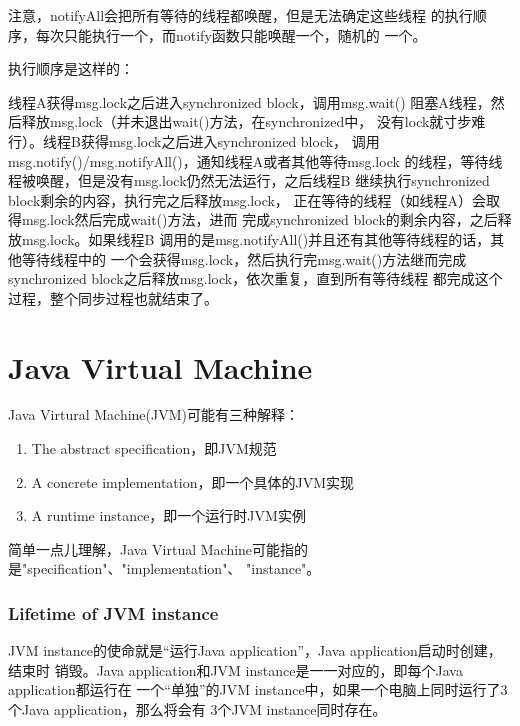 \documentclass[a4paper,11pt]{article}
\begin{document}
注意，notifyAll会把所有等待的线程都唤醒，但是无法确定这些线程
的执行顺序，每次只能执行一个，而notify函数只能唤醒一个，随机的
一个。

执行顺序是这样的：

线程A获得msg.lock之后进入synchronized block，调用msg.wait()
阻塞A线程，然后释放msg.lock（并未退出wait()方法，在synchronized中，
没有lock就寸步难行）。线程B获得msg.lock之后进入synchronized block，
调用msg.notify()/msg.notifyAll()，通知线程A或者其他等待msg.lock
的线程，等待线程被唤醒，但是没有msg.lock仍然无法运行，之后线程B
继续执行synchronized block剩余的内容，执行完之后释放msg.lock，
正在等待的线程（如线程A）会取得msg.lock然后完成wait()方法，进而
完成synchronized block的剩余内容，之后释放msg.lock。如果线程B
调用的是msg.notifyAll()并且还有其他等待线程的话，其他等待线程中的
一个会获得msg.lock，然后执行完msg.wait()方法继而完成
synchronized block之后释放msg.lock，依次重复，直到所有等待线程
都完成这个过程，整个同步过程也就结束了。


\part[JVM]{Java Virtual Machine}
Java Virtural Machine(JVM)可能有三种解释：
\begin{enumerate}
  \item The abstract specification，即JVM规范
  \item A concrete implementation，即一个具体的JVM实现
  \item A runtime instance，即一个运行时JVM实例
\end{enumerate}
简单一点儿理解，Java Virtual Machine可能指的是"specification"、"implementation"、
"instance"。

\section[Lifetime of JVM instance]{Lifetime of JVM instance}
JVM instance的使命就是“运行Java application”，Java application启动时创建，结束时
销毁。Java application和JVM instance是一一对应的，即每个Java application都运行在
一个“单独”的JVM instance中，如果一个电脑上同时运行了3个Java application，那么将会有
3个JVM instance同时存在。
\end{document}
